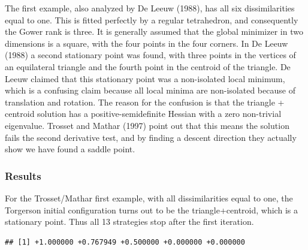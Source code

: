 \documentclass[
  12pt,
]{article}
\newenvironment{Shaded}{\begin{snugshade}}{\end{snugshade}}
\newcommand{\AttributeTok}[1]{\textcolor[rgb]{0.13,0.29,0.53}{#1}}
\newcommand{\DecValTok}[1]{\textcolor[rgb]{0.00,0.00,0.81}{#1}}
\newcommand{\FunctionTok}[1]{\textcolor[rgb]{0.13,0.29,0.53}{\textbf{#1}}}
\newcommand{\NormalTok}[1]{#1}
\newcommand{\OtherTok}[1]{\textcolor[rgb]{0.56,0.35,0.01}{#1}}
\newcommand{\SpecialCharTok}[1]{\textcolor[rgb]{0.81,0.36,0.00}{\textbf{#1}}}
\newcommand{\StringTok}[1]{\textcolor[rgb]{0.31,0.60,0.02}{#1}}
\begin{document}
The first example, also analyzed by De Leeuw (1988),
has all six dissimilarities equal to one. This is fitted perfectly by a regular
tetrahedron, and consequently the Gower rank is three. It is generally assumed that
the global minimizer in two dimensions is a square, with the four points in the
four corners. In De Leeuw (1988) a second stationary point was found, with three
points in the vertices of an equilateral triangle and the fourth point in the
centroid of the triangle. De Leeuw claimed that this stationary point was a
non-isolated local minimum, which is a confusing claim because all local
minima are non-isolated because of translation and rotation. The reason for
the confusion is that the triangle + centroid solution has a positive-semidefinite
Hessian with a zero non-trivial eigenvalue. Trosset and Mathar (1997) point out that this
means the solution fails the second derivative test, and by finding a descent direction
they actually show we have found a saddle point.

\subsubsection{Results}\label{results}

For the Trosset/Mathar first example, with all dissimilarities equal to one, the
Torgerson initial configuration turns out to be the triangle+centroid, which is
a stationary point. Thus all 13 strategies stop after the first iteration.

\begin{Shaded}
\end{Shaded}

\begin{verbatim}
## [1] +1.000000 +0.767949 +0.500000 +0.000000 +0.000000
\end{verbatim}

\begin{Shaded}
\end{Shaded}
\end{document}
